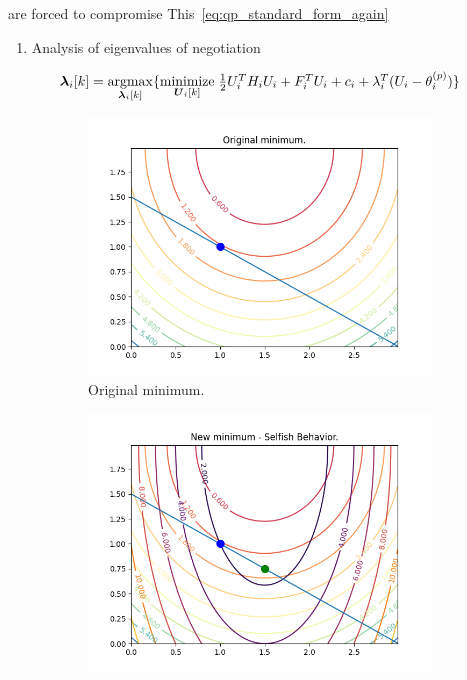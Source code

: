 \documentclass[../main.tex]{subfiles}
\begin{document}
are forced to compromise
This~\eqref{eq:qp_standard_form_again}

\begin{enumerate}
  \item Analysis of eigenvalues of negotiation
\end{enumerate}
\begin{equation}
  \begin{matrix}
    \lambdaik=\underset{\lambdaik}{\mathrm{argmax}}\{\underset{\vec{U}_i[k]}{\mathrm{minimize}}\;\frac{1}{2}U_i^TH_iU_i+F_i^TU_i+c_i+\lambda_i^T(U_i-\theta_i^{(p)})\}\\
  \end{matrix}
\end{equation}

\begin{figure}[h]
  \centering
  \begin{subfigure}{.45\textwidth}
    \includegraphics[width=\textwidth]{../img/original-minimum.png}
    \caption{Original minimum.}
    \label{fig:first}
  \end{subfigure}
  \hfill
  \begin{subfigure}{0.45\textwidth}
    \includegraphics[width=\textwidth]{../img/new-minimum-selfish.png}

\end{subfigure}
\end{figure}
\end{document}
